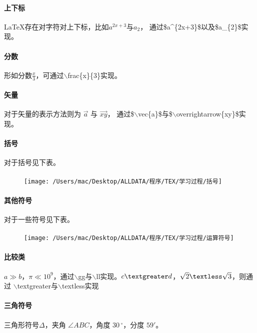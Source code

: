 \documentclass[UTF8]{ctexart}
\begin{document}
\paragraph{上下标} \LaTeX 存在对字符对上下标，比如$a^{2x+3}$与$a_{2}$，
 通过\$a\^{}\{2x+3\}\$以及\$a\_\{2\}\$实现。
\paragraph{分数} 形如分数$\frac{x}{3}$，可通过$\backslash$frac\{x\}\{3\}实现。
\paragraph{矢量} 对于矢量的表示方法则为 $\vec{a}$ 与 $\overrightarrow{xy}$，
 通过\$$\backslash$vec\{a\}\$与\$$\backslash$overrightarrow\{xy\}\$实现。
 \paragraph{括号} 对于括号见下表。

\begin{figure}[htbp]
\centering
\paragraph{} \texttt{[image: /Users/mac/Desktop/ALLDATA/程序/TEX/学习过程/括号]}\label{fig:figure}
\end{figure}

\paragraph{其他符号} 对于一些符号见下表。

\begin{figure}[htbp]
 \centering
 \paragraph{} \texttt{[image: /Users/mac/Desktop/ALLDATA/程序/TEX/学习过程/运算符号]}\label{fig:figure2}
\end{figure}
\paragraph{比较类} $a \gg b$，$\pi \ll 10^{9}$，通过$\backslash$gg与$\backslash$ll实现。$c \textgreater d$，$\sqrt {2} \textless \sqrt {3}$，则通过
$\backslash$textgreater与$\backslash$textless实现

\paragraph{三角符号} 三角形符号$\Delta$，夹角 $\angle{}ABC$，角度 $30\,^{\circ}$，分度 $59'$。
\end{document}
